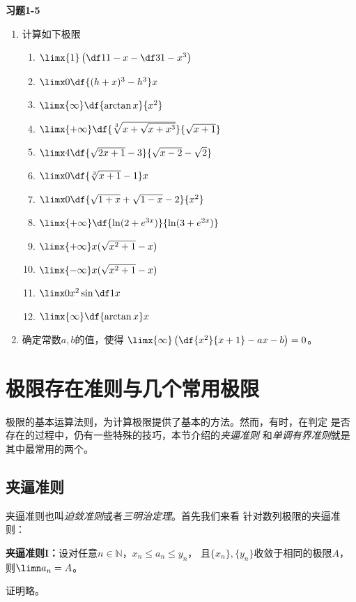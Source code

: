 \bs
\begin{ext}
	{\centering\bf 习题1-5}
	\begin{enumerate}  
	  \item 计算如下极限
	  \begin{enumerate}[(1)]
	    \item $\limx{1}\left(\df1{1-x}-\df3{1-x^3}\right)$
	    \item $\limx0\df{(h+x)^3-h^3}x$
	    \item $\limx{\infty}\df{\arctan x}{x^2}$
	    \item $\limx{+\infty}\df{\sqrt[3]{x+\sqrt{x+x^3}}}
	    {\sqrt{x+1}}$
	    \item $\limx4\df{\sqrt{2x+1}-3}{\sqrt{x-2}-\sqrt2}$
	    \item $\limx0\df{\sqrt[3]{x+1}-1}x$
	    \item $\limx0\df{\sqrt{1+x}+\sqrt{1-x}-2}{x^2}$
	    \item $\limx{+\infty}\df{\ln(2+e^{3x})}{\ln(3+e^{2x})}$
	    \item $\limx{+\infty}x(\sqrt{x^2+1}-x)$
	    \item $\limx{-\infty}x(\sqrt{x^2+1}-x)$
	    \item $\limx0x^2\sin\df1x$
	    \item $\limx{\infty}\df{\arctan x}x$
	  \end{enumerate}
	  \item 确定常数$a,b$的值，使得
	  $\limx{\infty}\left(\df{x^2}{x+1}-ax-b\right)=0$。
	\end{enumerate}
\end{ext}

\newpage
\section{极限存在准则与几个常用极限}

极限的基本运算法则，为计算极限提供了基本的方法。然而，有时，在判定
是否存在的过程中，仍有一些特殊的技巧，本节介绍的{\it 夹逼准则}
和{\it 单调有界准则}就是其中最常用的两个。

\subsection{夹逼准则}

夹逼准则也叫{\it 迫敛准则}或者{\it 三明治定理}。首先我们来看
针对数列极限的夹逼准则：
\begin{thx}
	{\bf 夹逼准则I：}设对任意$n\in\mathbb{N}$，$x_n\le a_n\le y_n$，
	且$\{x_n\},\{y_n\}$收敛于相同的极限$A$，则$\limn a_n=A$。
\end{thx}
证明略。

